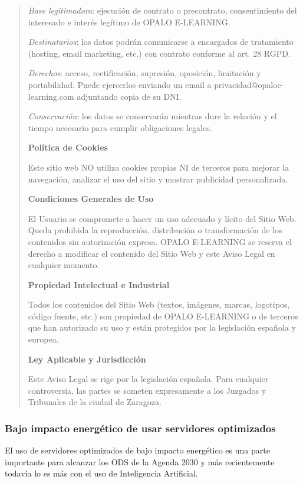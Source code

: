 \documentclass[11.5pt]{article}
\begin{document}
\begin{quotation}
		\textit{Base legitimadora}: ejecución de contrato o precontrato, consentimiento del interesado e interés legítimo de OPALO E-LEARNING.
		
		\textit{Destinatarios}: los datos podrán comunicarse a encargados de tratamiento (hosting, email marketing, etc.) con
		contrato conforme al art. 28 RGPD.
		
		\textit{Derechos}: acceso, rectificación, supresión, oposición, limitación y portabilidad. Puede ejercerlos enviando un email a privacidad@opaloe-learning.com adjuntando copia de su DNI.
		
		\textit{Conservación}: los datos se conservarán mientras dure la relación y el tiempo necesario para cumplir obligaciones legales.
		
		\textbf{Política de Cookies}
		
		Este sitio web NO utiliza cookies propias NI de terceros para mejorar la navegación, analizar el uso del sitio y mostrar publicidad personalizada.
		
		\textbf{Condiciones Generales de Uso}
		
		El Usuario se compromete a hacer un uso adecuado y lícito del Sitio Web.
		Queda prohibida la reproducción, distribución o transformación de los contenidos sin autorización expresa.
		OPALO E-LEARNING se reserva el derecho a modificar el contenido del Sitio Web y este Aviso Legal en
		cualquier momento.
		
		\textbf{Propiedad Intelectual e Industrial}
		
		Todos los contenidos del Sitio Web (textos, imágenes, marcas, logotipos, código fuente, etc.) son propiedad de OPALO E-LEARNING o de terceros que han autorizado su uso y están protegidos por la legislación española y europea.
		
		\textbf{Ley Aplicable y Jurisdicción}
		
		Este Aviso Legal se rige por la legislación española. Para cualquier controversia, las partes se someten expresamente a los Juzgados y Tribunales de la ciudad de Zaragoza.
	\end{quotation}
	
	\subsubsection*{Bajo impacto energético de usar servidores optimizados}
	
	El uso de servidores optimizados de bajo impacto energético es una parte importante para alcanzar los ODS
	de la Agenda 2030 y más recientemente todavía lo es más con el uso de Inteligencia Artificial.
\end{document}
